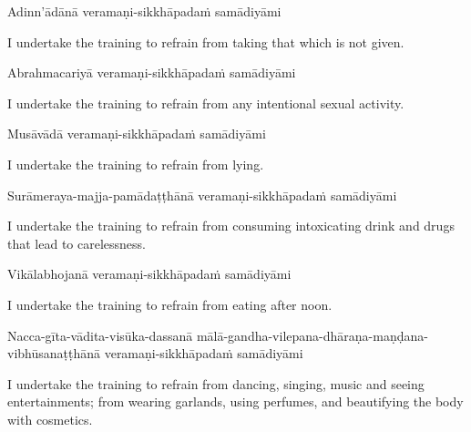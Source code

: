 Adinn'ādānā veramaṇi-sikkhāpadaṁ samādiyāmi

\begin{english-hang}
  I undertake the training to refrain from taking that which is not given.
\end{english-hang}

Abrahmacariyā veramaṇi-sikkhāpadaṁ samādiyāmi

\begin{english-hang}
  I undertake the training to refrain from any intentional sexual activity.
\end{english-hang}

Musāvādā veramaṇi-sikkhāpadaṁ samādiyāmi

\begin{english}
  I undertake the training to refrain from lying.
\end{english}

\begin{pali-hang}
  Surāmeraya-majja-pamādaṭṭhānā veramaṇi-sikkhāpadaṁ samādiyāmi
\end{pali-hang}

\begin{english-hang}
  I undertake the training to refrain from consuming intoxicating drink and drugs that\makeatletter\hyperlink{endnote141-appendix}\makeatother
  lead to carelessness.
\end{english-hang}

Vikālabhojanā veramaṇi-sikkhāpadaṁ samādiyāmi

\begin{english}
  I undertake the training to refrain from eating after noon.\makeatletter\hyperlink{endnote142-appendix}\makeatother
\end{english}

\begin{pali-hang}
  Nacca-gīta-vādita-visūka-dassanā mālā-gandha-vilepana-dhāraṇa-maṇḍana-vibhūsanaṭṭhānā veramaṇi-sikkhāpadaṁ samādiyāmi
\end{pali-hang}

\begin{english-hang}
  I undertake the training to refrain from dancing, singing, music and seeing entertainments; from wearing garlands, using perfumes, and beautifying the body with cosmetics.\makeatletter\hyperlink{endnote143-appendix}\makeatother
\end{english-hang}

